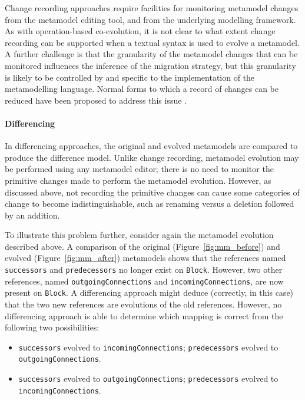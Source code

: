 Change recording approaches require facilities for monitoring metamodel changes from the metamodel editing tool, and from the underlying modelling framework. As with operation-based co-evolution, it is not clear to what extent change recording can be supported when a textual syntax is used to evolve a metamodel. A further challenge is that the granularity of the metamodel changes that can be monitored influences the inference of the migration strategy, but this granularity is likely to be controlled by and specific to the implementation of the metamodelling language. Normal forms \cc to which a record of changes can be reduced have been proposed to address this issue \cite{cicchetti08thesis}.


\paragraph{Differencing}
In differencing approaches, the original and evolved metamodels are compared to produce the difference model. Unlike change recording, metamodel evolution may be performed using any metamodel editor; there is no need to monitor the primitive changes made to perform the metamodel evolution. However, as discussed above, not recording the primitive changes can cause some categories of change to become indistinguishable, such as renaming versus a deletion followed by an addition.

To illustrate this problem further, consider again the metamodel evolution described above. A comparison of the original (Figure~\ref{fig:mm_before}) and evolved (Figure~\ref{fig:mm_after}) metamodels shows that the references named \texttt{successors} and \texttt{predecessors} no longer exist on \texttt{Block}. However, two other references, named \texttt{out\-go\-ingCon\-nect\-ions} and \texttt{incomingConnections}, are now present on \texttt{Block}. A differencing approach might deduce (correctly, in this case) that the two new references are evolutions of the old references. However, no differencing approach is able to determine which mapping is correct from the following two possibilities:

\begin{itemize}
	\item \texttt{successors} evolved to \texttt{incomingConnections}; \texttt{predecessors} evolved to \texttt{outgoingConnections}.
	\item \texttt{successors} evolved to \texttt{outgoingConnections}; \texttt{predecessors} evolved to \texttt{incomingConnections}.
\end{itemize}

